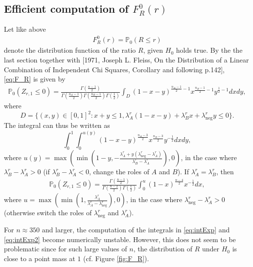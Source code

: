 \documentclass{article}
\theoremstyle{definition}
\theoremstyle{remark}
\renewcommand{\P}{\mathbb{P}}  %
\begin{document}
\subsection{Efficient computation of $F_R^0(r)$}
Let like above
\begin{align}\label{eq:F_R}
	F_R^0(r) = \P_0(R \leq r)
\end{align}
denote the distribution function of the ratio $R$, given $H_0$ holds true. By the the last section together with [1971, Joseph L. Fleiss, On the Distribution of a Linear Combination of Independent Chi Squares, Corollary and following p.142], \eqref{eq:F_R} is given by
\begin{align}\label{eq:intExp}
	\P_0(Z_{r, 1} \leq 0) = \frac{\Gamma\left(\frac{n -1}{2} \right)}{\Gamma\left(\frac{n_A -1}{2} \right)\Gamma\left(\frac{n_B -1}{2} \right)\Gamma\left(\frac{1}{2} \right)} \int_D (1-x-y)^{\frac{n_A -1}{2} - 1} x^{\frac{n_B -1}{2} - 1} y^{\frac{1}{2} - 1} dx dy,
\end{align}
where
$$
	D = \{(x, y) \in [0, 1]^2 \colon x + y \leq 1, \lambda_A^r(1-x-y) + \lambda_B^r x + \lambda_{\text{neg}}^r y \leq 0\}.
$$
The integral can thus be written as
$$
	\int_0^1 \int_0^{u(y)} (1-x-y)^{\frac{n_A -3}{2} } x^{\frac{n_B -3}{2} } y^{-\frac{1}{2} } dx dy,
$$
where $u(y) = \max\left(\min\left(1 - y, - \frac{\lambda_A^r + y(\lambda_{\text{neg}}^r - \lambda_A^r)}{\lambda_{B}^r - \lambda_A^r}\right), 0 \right)$, in the case where $\lambda_{B}^r - \lambda_A^r > 0$ (if $\lambda_{B}^r - \lambda_A^r < 0$, change the roles of $A$ and $B$). If $\lambda_A^r = \lambda_B^r$, then
\begin{align}\label{eq:intExp2}
	\P_0(Z_{r, 1} \leq 0) = \frac{\Gamma\left(\frac{n -1}{2} \right)}{\Gamma\left(\frac{n -2}{2} \right)\Gamma\left(\frac{1}{2} \right)} \int_0^u (1-x)^{\frac{n -4}{2} }  x^{-\frac{1}{2}} dx,
\end{align}
where $u = \max\left(\min\left(1, \frac{\lambda_A^r}{\lambda_A^r - \lambda_{\text{neg}}^r} \right), 0 \right)$, in the case where $\lambda_{\text{neg}}^r- \lambda_A^r > 0$ (otherwise switch the roles of $\lambda_{\text{neg}}^r$ and $\lambda_A^r$).

For $n \approx 350$ and larger, the computation of the integrals in \eqref{eq:intExp} and \eqref{eq:intExp2} become numerically unstable. However, this does not seem to be problematic since for such large values of $n$, the distribution  of $R$ under $H_0$ is close to a point mass at $1$ (cf. Figure \ref{fig:F_R}).

\end{document}
